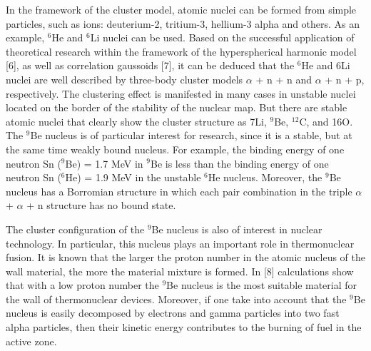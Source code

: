 \documentclass[
12pt, %
oneside, %
english, %
onehalfspacing, %
onehalfspacing, %
headsepline, %
]{MastersDoctoralThesis} %
\begin{document}
In the framework of the cluster model, atomic nuclei can be formed from simple particles, such as ions: deuterium-2, tritium-3, hellium-3 alpha and others.
 As an example, $^{6}$He and $^6$Li nuclei can be used. 
 Based on the successful application of theoretical research within the framework of the hyperspherical harmonic model [6], as well as correlation gaussoids [7], it can be deduced that the $^{6}$He and 6Li nuclei are well described by three-body cluster models $\alpha$ + n + n and $\alpha$ + n + p, respectively.
The clustering effect is manifested in many cases in unstable nuclei located on the border of the stability of the nuclear map.
 But there are stable atomic nuclei that clearly show the cluster structure as 7Li, $^{9}$Be, $^{12}$C, and 16O. 
 The $^{9}$Be nucleus is of particular interest for research, since it is a stable, but at the same time weakly bound nucleus. 
 For example, the binding energy of one neutron Sn ($^{9}$Be) = 1.7 MeV in $^{9}$Be is less than the binding energy of one neutron Sn ($^{6}$He) = 1.9 MeV in the unstable $^{6}$He nucleus. 
 Moreover, the $^{9}$Be nucleus has a Borromian structure in which each pair combination in the triple $\alpha$ + $\alpha$ + n structure has no bound state.


The cluster configuration of the $^{9}$Be nucleus is also of interest in nuclear technology. In particular, this nucleus plays an important role in thermonuclear fusion. It is known that the larger the proton number in the atomic nucleus of the wall material, the more the material mixture is formed. In [8] calculations show that with a low proton number the $^{9}$Be nucleus is the most suitable material for the wall of thermonuclear devices. Moreover, if one take into account that the $^{9}$Be nucleus is easily decomposed by electrons and gamma particles into two fast alpha particles, then their kinetic energy contributes to the burning of fuel in the active zone.
\end{document}
